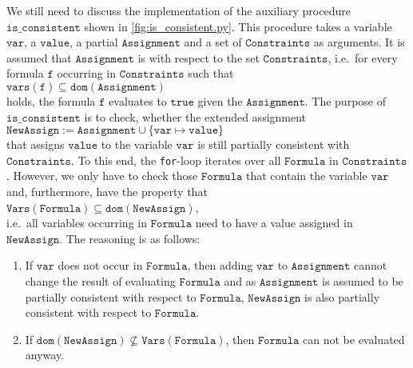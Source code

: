We still need to discuss the implementation of the auxiliary procedure $\texttt{is\_consistent}$
shown in \ref{fig:is_consistent.py}.  This procedure takes a variable $\texttt{var}$, a $\texttt{value}$, a partial 
$\texttt{Assignment}$ and a set of $\texttt{Constraints}$ as arguments.  It is assumed that $\texttt{Assignment}$ is
 with respect to the set $\texttt{Constraints}$, i.e.~for every formula $\texttt{f}$
occurring in $\texttt{Constraints}$ such that
\\[0.2cm]
\hspace*{1.3cm}
$\texttt{vars}(\texttt{f}) \subseteq \texttt{dom}(\texttt{Assignment})$
\\[0.2cm]
holds, the formula $\texttt{f}$ evaluates to $\texttt{true}$ given the $\texttt{Assignment}$.  The purpose of
$\texttt{is\_consistent}$ is to check, whether the extended assignment
\\[0.2cm]
\hspace*{1.3cm}
$\texttt{NewAssign} \;\texttt{:=}\;\texttt{Assignment} \cup \{ \texttt{var} \mapsto \texttt{value} \}$
\\[0.2cm]
that assigns $\texttt{value}$ to the variable $\texttt{var}$ is still partially consistent with $\texttt{Constraints}$. 
To this end, the \texttt{for}-loop iterates over all $\texttt{Formula}$ in $\texttt{Constraints}$. 
However, we only have to check those $\texttt{Formula}$ that contain the variable $\texttt{var}$ and,
furthermore, have the property that
\\[0.2cm]
\hspace*{1.3cm}
$\texttt{Vars}(\texttt{Formula}) \subseteq \texttt{dom}(\texttt{NewAssign})$,
\\[0.2cm]
i.e.~all variables occurring in $\texttt{Formula}$ need to have a value assigned in
$\texttt{NewAssign}$.  The reasoning is as follows:
\begin{enumerate}
\item If $\texttt{var}$ does not occur in $\texttt{Formula}$, then adding $\texttt{var}$ to
      $\texttt{Assignment}$ cannot change the result of evaluating $\texttt{Formula}$ and as
      $\texttt{Assignment}$ is assumed to be partially consistent with respect to $\texttt{Formula}$, 
      $\texttt{NewAssign}$ is also partially consistent with respect to $\texttt{Formula}$.
\item If $\texttt{dom}(\texttt{NewAssign}) \not\subseteq \texttt{Vars}(\texttt{Formula})$, then $\texttt{Formula}$ can not be evaluated anyway. 
\end{enumerate}

